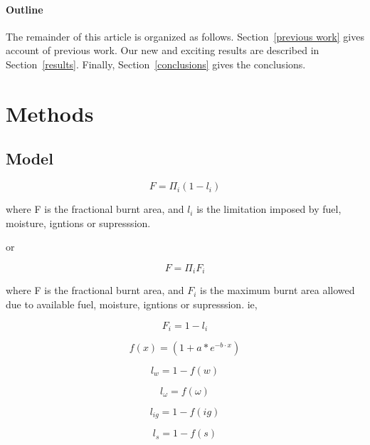 \documentclass[12pt]{article}
\begin{document}
\paragraph{Outline}
The remainder of this article is organized as follows.
Section~\ref{previous work} gives account of previous work.
Our new and exciting results are described in Section~\ref{results}.
Finally, Section~\ref{conclusions} gives the conclusions.

\section{Methods}

\subsection{Model}

\begin{equation}
    F=\Pi_{i} (1 - l_i)
\end{equation}

where F is the fractional burnt area, and $l_i$ is the limitation imposed by fuel, moisture, igntions or supresssion.
\newline

or

\begin{equation} 
    F=\Pi_{i} F_i 
\end{equation}

where F is the fractional burnt area, and $F_i$ is the maximum burnt area allowed due to available fuel, moisture, igntions or supresssion. ie, 

\begin{equation}
    F_i = 1 - l_i
\end{equation}

\begin{equation}
    f(x) = (1 + a * e^{-b \cdot x})
\end{equation}

\begin{equation}
    l_{w} = 1 - f(w)
\end{equation}

\begin{equation}
    l_{\omega} = f(\omega)
\end{equation}

\begin{equation}
    l_{ig} = 1 - f(ig)
\end{equation}

\begin{equation}
    l_{s} = 1- f(s)
\end{equation}
\end{document}
